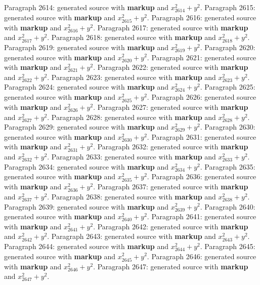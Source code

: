 \documentclass{article}
\begin{document}
Paragraph 2614: generated source with \textbf{markup} and $x_{2614}^2 + y^2$.
Paragraph 2615: generated source with \textbf{markup} and $x_{2615}^2 + y^2$.
Paragraph 2616: generated source with \textbf{markup} and $x_{2616}^2 + y^2$.
Paragraph 2617: generated source with \textbf{markup} and $x_{2617}^2 + y^2$.
Paragraph 2618: generated source with \textbf{markup} and $x_{2618}^2 + y^2$.
Paragraph 2619: generated source with \textbf{markup} and $x_{2619}^2 + y^2$.
Paragraph 2620: generated source with \textbf{markup} and $x_{2620}^2 + y^2$.
Paragraph 2621: generated source with \textbf{markup} and $x_{2621}^2 + y^2$.
Paragraph 2622: generated source with \textbf{markup} and $x_{2622}^2 + y^2$.
Paragraph 2623: generated source with \textbf{markup} and $x_{2623}^2 + y^2$.
Paragraph 2624: generated source with \textbf{markup} and $x_{2624}^2 + y^2$.
Paragraph 2625: generated source with \textbf{markup} and $x_{2625}^2 + y^2$.
Paragraph 2626: generated source with \textbf{markup} and $x_{2626}^2 + y^2$.
Paragraph 2627: generated source with \textbf{markup} and $x_{2627}^2 + y^2$.
Paragraph 2628: generated source with \textbf{markup} and $x_{2628}^2 + y^2$.
Paragraph 2629: generated source with \textbf{markup} and $x_{2629}^2 + y^2$.
Paragraph 2630: generated source with \textbf{markup} and $x_{2630}^2 + y^2$.
Paragraph 2631: generated source with \textbf{markup} and $x_{2631}^2 + y^2$.
Paragraph 2632: generated source with \textbf{markup} and $x_{2632}^2 + y^2$.
Paragraph 2633: generated source with \textbf{markup} and $x_{2633}^2 + y^2$.
Paragraph 2634: generated source with \textbf{markup} and $x_{2634}^2 + y^2$.
Paragraph 2635: generated source with \textbf{markup} and $x_{2635}^2 + y^2$.
Paragraph 2636: generated source with \textbf{markup} and $x_{2636}^2 + y^2$.
Paragraph 2637: generated source with \textbf{markup} and $x_{2637}^2 + y^2$.
Paragraph 2638: generated source with \textbf{markup} and $x_{2638}^2 + y^2$.
Paragraph 2639: generated source with \textbf{markup} and $x_{2639}^2 + y^2$.
Paragraph 2640: generated source with \textbf{markup} and $x_{2640}^2 + y^2$.
Paragraph 2641: generated source with \textbf{markup} and $x_{2641}^2 + y^2$.
Paragraph 2642: generated source with \textbf{markup} and $x_{2642}^2 + y^2$.
Paragraph 2643: generated source with \textbf{markup} and $x_{2643}^2 + y^2$.
Paragraph 2644: generated source with \textbf{markup} and $x_{2644}^2 + y^2$.
Paragraph 2645: generated source with \textbf{markup} and $x_{2645}^2 + y^2$.
Paragraph 2646: generated source with \textbf{markup} and $x_{2646}^2 + y^2$.
Paragraph 2647: generated source with \textbf{markup} and $x_{2647}^2 + y^2$.
\end{document}
